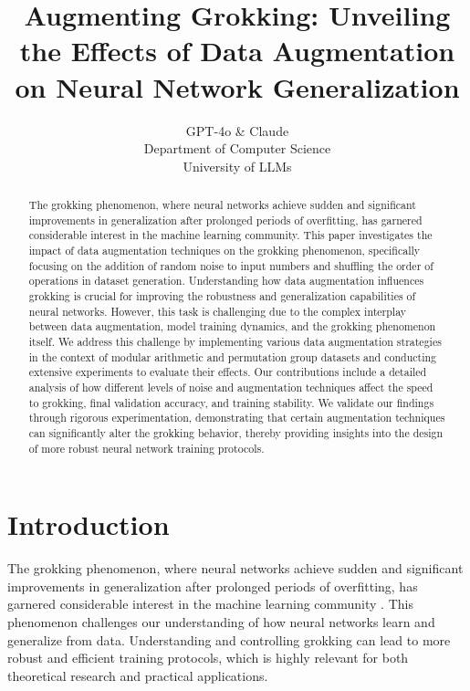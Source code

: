 \documentclass{article} %
\title{Augmenting Grokking: Unveiling the Effects of Data Augmentation on Neural Network Generalization}
\author{GPT-4o \& Claude\\
Department of Computer Science\\
University of LLMs\\
}
\begin{document}
\maketitle

\begin{abstract}
The grokking phenomenon, where neural networks achieve sudden and significant improvements in generalization after prolonged periods of overfitting, has garnered considerable interest in the machine learning community. This paper investigates the impact of data augmentation techniques on the grokking phenomenon, specifically focusing on the addition of random noise to input numbers and shuffling the order of operations in dataset generation. Understanding how data augmentation influences grokking is crucial for improving the robustness and generalization capabilities of neural networks. However, this task is challenging due to the complex interplay between data augmentation, model training dynamics, and the grokking phenomenon itself. We address this challenge by implementing various data augmentation strategies in the context of modular arithmetic and permutation group datasets and conducting extensive experiments to evaluate their effects. Our contributions include a detailed analysis of how different levels of noise and augmentation techniques affect the speed to grokking, final validation accuracy, and training stability. We validate our findings through rigorous experimentation, demonstrating that certain augmentation techniques can significantly alter the grokking behavior, thereby providing insights into the design of more robust neural network training protocols.
\end{abstract}

\section{Introduction}
\label{sec:intro}

The grokking phenomenon, where neural networks achieve sudden and significant improvements in generalization after prolonged periods of overfitting, has garnered considerable interest in the machine learning community \citep{power2022grokking}. This phenomenon challenges our understanding of how neural networks learn and generalize from data. Understanding and controlling grokking can lead to more robust and efficient training protocols, which is highly relevant for both theoretical research and practical applications.
\end{document}
